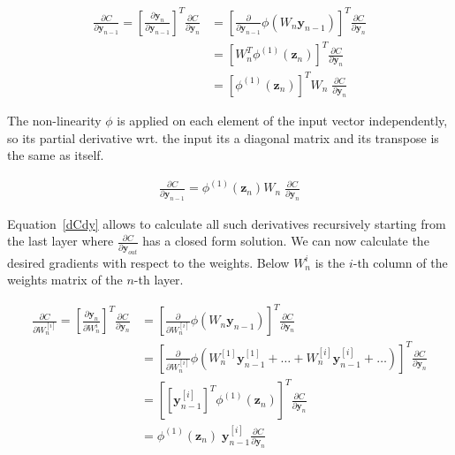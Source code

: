 \documentclass[11pt]{article}
\begin{document}
    \begin{align}
        \frac{ \partial C}{\partial \textbf{y}_{n-1} }
        =
        \left[ \frac{ \partial \textbf{y}_{n}}{\partial \textbf{y}_{n-1}  } \right]^T
        \frac{ \partial C}{\partial \textbf{y}_{n} }
        &=
        \left[ \frac{ \partial}{\partial \textbf{y}_{n-1} } \phi(W_n \textbf{y}_{n-1}) \right]^T
        \frac{ \partial C}{\partial \textbf{y}_{n} }
        \\
        &=
        \left[ W_n^T \phi^{(1)}( \pmb{z}_n ) \right]^T
        \frac{ \partial C}{\partial \textbf{y}_{n} }
        \\
        &=
        \left[ \phi^{(1)}( \pmb{z}_n ) \right]^T
        W_n \;
        \frac{ \partial C}{\partial \textbf{y}_{n} }
    \end{align}

    The non-linearity $\phi$ is applied on each element of the input vector independently, so its partial derivative wrt.
    the input its a diagonal matrix and its transpose is the same as itself.

    \begin{align}
        \frac{ \partial C}{\partial \textbf{y}_{n-1} }
        =
        \phi^{(1)}( \pmb{z}_n )
        W_n \;
        \frac{ \partial C}{\partial \textbf{y}_{n} }
        \label{dCdy}
    \end{align}

    Equation~\eqref{dCdy} allows to calculate all such derivatives recursively starting from the last layer where $\frac{\partial C}{\partial \textbf{y}_{out}}$ has a closed form solution.
    We can now calculate the desired gradients with respect to the weights.
    Below $W_n^i$ is the $i$-th column of the weights matrix of the $n$-th layer.

    \begin{align*}
        \frac{ \partial C}{\partial W_n^{[i]} }
        =
        \left[ \frac{ \partial \pmb{y}_{n}}{\partial W_n^i } \right]^T
        \frac{ \partial C}{\partial \pmb{y}_{n} }
        &=
        \left[ \frac{ \partial }{\partial W_n^{[i]} }  \phi( W_{n} \bm{y}_{n-1} )  \right]^T
        \frac{ \partial C}{\partial \pmb{y}_{n} }
        \\
        &=
        \left[ \frac{ \partial }{\partial W_n^{[i]} }  \phi(  W_{n}^{[1]} \bm{y}_{n-1}^{[1]} + \dots +W_{n}^{[i]} \bm{y}_{n-1}^{[i]} + \dots )  \right]^T
        \frac{ \partial C}{\partial \pmb{y}_{n} }
        \\
        &=
        \left[ \left[ \pmb{y}_{n-1}^{[i]} \right]^T \phi^{(1)}(\pmb{z}_n )  \right]^T
        \frac{ \partial C}{\partial \pmb{y}_{n} }
        \\
        &=
        \phi^{(1)}(\pmb{z}_n ) \; \pmb{y}_{n-1}^{[i]}
        \frac{ \partial C}{\partial \pmb{y}_{n} }
    \end{align*}
\end{document}
